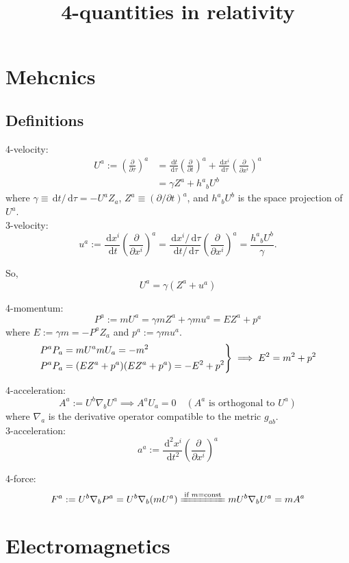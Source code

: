 \documentclass{article}
\title{4-quantities in relativity}
\newcommand{\be}{\begin{equation}}
\newcommand{\ee}{\end{equation}}
\newcommand{\dif}{\,\mathrm{d}}
\newcommand{\p}{\partial}
\newcommand{\1}{\left}
\newcommand{\2}{\right}
\begin{document}
\maketitle

\section{Mehcnics}
\subsection*{Definitions}
4-velocity:
\be 
\begin{split}
U^a:=\1(\frac{\p}{\p\tau}\2)^a&=\frac{\dif t}{\dif\tau}\1(\frac{\p}{\p t}\2)^a+\frac{\dif x^i}{\dif \tau}\1(\frac{\p}{\p x^i}\2)^a\\
&=\gamma Z^a+h^a{}_b U^b
\end{split}
\ee
where $\gamma\equiv\dif t/\dif \tau=-U^a Z_a$, $Z^a\equiv(\p/\p t)^a$, and $h^a{}_b U^b$ is the space projection of $U^a$.\\

3-velocity:
\be 
u^a:=\frac{\dif x^i}{\dif t}\1(\frac{\p}{\p x^i}\2)^a=\frac{\dif x^i/\dif\tau}{\dif t/\dif\tau}\1(\frac{\p}{\p x^i}\2)^a=\frac{h^a{}_b U^b}{\gamma}.
\ee

So,
\be 
U^a=\gamma (Z^a+u^a)
\ee

4-momentum:
\be 
P^a:=mU^a=\gamma m Z^a+\gamma m u^a=E Z^a+p^a
\ee
where $E:=\gamma m=-P^aZ_a$ and $p^a:=\gamma m u^a$.\\

\be 
\1.
\begin{lgathered}
P^aP_a=mU^amU_a=-m^2\\
P^aP_a=(E Z^a+p^a)(E Z^a+p^a)=-E^2+p^2
\end{lgathered}
\2\}
\implies
E^2=m^2+p^2
\ee

4-acceleration:
\be 
A^a:=U^b\nabla_bU^a \implies A^aU_a=0\quad(\text{$A^a$ is orthogonal to $U^a$})
\ee
where $\nabla_a$ is the derivative operator compatible to the metric $g_{ab}$.\\

3-acceleration:
\be 
a^a:=\frac{\dif^2x^i}{\dif t^2}\1(\frac{\p}{\p x^i}\2)^a
\ee

4-force:
\be 
F^a:=U^b\nabla_bP^a=U^b\nabla_b(mU^a)\xlongequal{\text{if $m$=const}}mU^b\nabla_bU^a =mA^a
\ee

\section{Electromagnetics}
\end{document}
